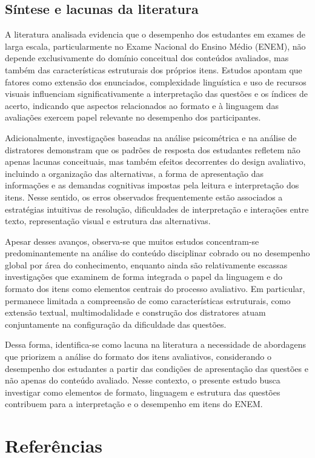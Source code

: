 \documentclass[a4paper,10pt, twocolumn]{article}
\begin{document}
\subsection{Síntese e lacunas da literatura}

A literatura analisada evidencia que o desempenho dos estudantes em exames de larga escala, particularmente no Exame Nacional do Ensino Médio (ENEM), não depende exclusivamente do domínio conceitual dos conteúdos avaliados, mas também das características estruturais dos próprios itens. Estudos apontam que fatores como extensão dos enunciados, complexidade linguística e uso de recursos visuais influenciam significativamente a interpretação das questões e os índices de acerto, indicando que aspectos relacionados ao formato e à linguagem das avaliações exercem papel relevante no desempenho dos participantes.

Adicionalmente, investigações baseadas na análise psicométrica e na análise de distratores demonstram que os padrões de resposta dos estudantes refletem não apenas lacunas conceituais, mas também efeitos decorrentes do design avaliativo, incluindo a organização das alternativas, a forma de apresentação das informações e as demandas cognitivas impostas pela leitura e interpretação dos itens. Nesse sentido, os erros observados frequentemente estão associados a estratégias intuitivas de resolução, dificuldades de interpretação e interações entre texto, representação visual e estrutura das alternativas.

Apesar desses avanços, observa-se que muitos estudos concentram-se predominantemente na análise do conteúdo disciplinar cobrado ou no desempenho global por área do conhecimento, enquanto ainda são relativamente escassas investigações que examinem de forma integrada o papel da linguagem e do formato dos itens como elementos centrais do processo avaliativo. Em particular, permanece limitada a compreensão de como características estruturais, como extensão textual, multimodalidade e construção dos distratores atuam conjuntamente na configuração da dificuldade das questões.

Dessa forma, identifica-se como lacuna na literatura a necessidade de abordagens que priorizem a análise do formato dos itens avaliativos, considerando o desempenho dos estudantes a partir das condições de apresentação das questões e não apenas do conteúdo avaliado. Nesse contexto, o presente estudo busca investigar como elementos de formato, linguagem e estrutura das questões contribuem para a interpretação e o desempenho em itens do ENEM.


\section{Referências}
\printbibliography[heading=none]
\end{document}
